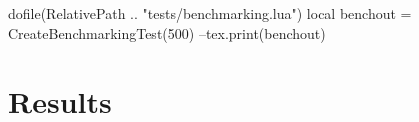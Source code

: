 \documentclass[oneside]{memoir}
\begin{document}
\pagestyle{empty}

\begin{luacode*}
	dofile(RelativePath .. "tests/benchmarking.lua")
	local benchout = CreateBenchmarkingTest(500)
	--tex.print(benchout)
\end{luacode*}

\chapter{Results}

\PrintRpgTexErrors

\PrintRpgTexBenchmarking
\end{document}
